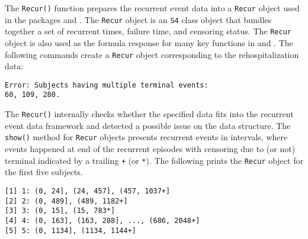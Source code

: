 The \texttt{Recur()} function prepares the recurrent event data into a
\texttt{Recur} object used in the packages  and .
The \texttt{Recur} object is an \texttt{S4} class object that bundles
together a set of recurrent times, failure time, and censoring status.
The \texttt{Recur} object is also used as the formula response for many
key functions in  and . The following commands
create a \texttt{Recur} object corresponding to the rehospitalization
data:

\begin{Shaded}
\begin{Highlighting}[]
 \NormalTok{)}
\end{Highlighting}
\end{Shaded}

\begin{verbatim}
Error: Subjects having multiple terminal events:
60, 109, 280.
\end{verbatim}

The \texttt{Recur()} internally checks whether the specified data fits
into the recurrent event data framework and detected a possible issue on
the data structure. The \texttt{show()} method for \texttt{Recur}
objects presents recurrent events in intervals, where events happened at
end of the recurrent episodes with censoring due to (or not) terminal
indicated by a trailing \texttt{+} (or \texttt{*}). The following prints
the \texttt{Recur} object for the first five subjects.

\begin{Shaded}
\begin{Highlighting}[]
\NormalTok{(readmission[}\NormalTok{:}\NormalTok{,], }
\end{Highlighting}
\end{Shaded}

\begin{verbatim}
[1] 1: (0, 24], (24, 457], (457, 1037+]       
[2] 2: (0, 489], (489, 1182+]                 
[3] 3: (0, 15], (15, 783*]                    
[4] 4: (0, 163], (163, 288], ..., (686, 2048+]
[5] 5: (0, 1134], (1134, 1144+]               
\end{verbatim}
